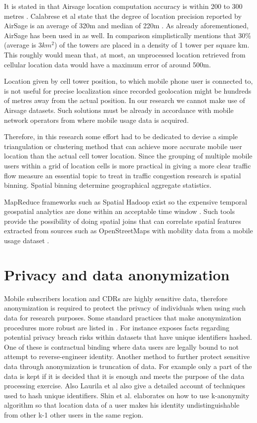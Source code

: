 \documentclass[12pt, a4paper]{report}
\theoremstyle{definition}
\theoremstyle{definition}%
\theoremstyle{definition}%
\theoremstyle{definition}%
\theoremstyle{definition}%
\theoremstyle{definition}%
\begin{document}
It is stated in \cite{Colak2015} that Airsage location computation accuracy is within 200 to 300 metres . Calabrese et al state that the degree of location precision reported by AirSage is an average of 320m and median of 220m \cite{Calabrese2013}. As already aforementioned, AirSage has been used in \cite{Hoteit2014} as well. In comparison \cite{Gonzalez2008} simplistically mentions that 30\% (average is \(3km^{2}\)) of the towers are placed in a density of 1 tower per square km. This roughly would mean that, at most, an unprocessed location retrieved from cellular location data would have a maximum error of around 500m. 

Location given by cell tower position, to which mobile phone user is connected to, is not useful for precise localization since recorded geolocation might be hundreds of metres away from the actual position. In our research we cannot make use of Airsage datasets. Such solutions must be already in accordance with mobile network operators from where mobile usage data is acquired.

Therefore, in this research some effort had to be dedicated to devise a simple triangulation or clustering method that can achieve more accurate mobile user location than the actual cell tower location. Since the grouping of multiple mobile users within a grid of location cells is more practical in giving a more clear traffic flow measure an essential topic to treat in traffic congestion research is spatial binning. Spatial binning determine geographical aggregate statistics. 

MapReduce frameworks such as Spatial Hadoop exist so the expensive temporal geospatial analytics are done within an acceptable time window \cite{Wu2014,eldawy2015spatialhadoop}. Such tools provide the possibility of doing spatial joins that can correlate spatial features extracted from sources such as OpenStreetMaps with mobility data from a mobile usage dataset \cite{Alarabi2014}.


\section{Privacy and data anonymization} \label{data_anonymization} 


Mobile subscribers location and CDRs are highly sensitive data, therefore anonymization is required to protect the privacy of individuals when using such data for research purposes. Some standard practices that make anonymization procedures more robust are listed in \cite{Laurila2012}. For instance \cite{Laurila2012} exposes facts regarding potential privacy breach risks within datasets that have unique identifiers hashed.  One of these is contractual binding where data users are legally bound to not attempt to reverse-engineer identity. Another method to further protect sensitive data through anonymization is truncation of data. For example only a part of the data is kept if it is decided that it is enough and meets the purpose of the data processing exercise. Also Laurila et al also give a detailed account of techniques used to hash unique identifiers. Shin et al. elaborates on how to use k-anonymity algorithm so that location data of a user makes his identity undistinguishable from other k-1 other users in the same region.
\end{document}
